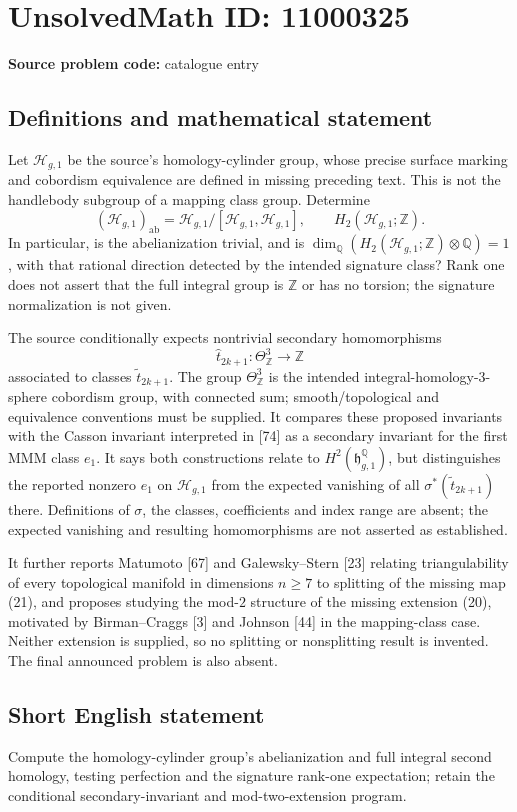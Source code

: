 \documentclass[11pt]{article}
\newcommand{\Z}{\mathbb{Z}}
\newcommand{\Q}{\mathbb{Q}}
\begin{document}
\section*{UnsolvedMath ID: 11000325}
\textbf{Source problem code:} catalogue entry
\subsection{Definitions and mathematical statement}
Let \(\mathcal H_{g,1}\) be the source's homology-cylinder group, whose precise surface marking and cobordism equivalence are defined in missing preceding text. This is not the handlebody subgroup of a mapping class group. Determine
\[
 (\mathcal H_{g,1})_{\mathrm{ab}}
   =\mathcal H_{g,1}/[\mathcal H_{g,1},\mathcal H_{g,1}],
 \qquad H_2(\mathcal H_{g,1};\Z).
\]
In particular, is the abelianization trivial, and is
\(\dim_\Q(H_2(\mathcal H_{g,1};\Z)\otimes\Q)=1\), with that rational direction detected by the intended signature class? Rank one does not assert that the full integral group is \(\Z\) or has no torsion; the signature normalization is not given.

The source conditionally expects nontrivial secondary homomorphisms
\[
 \widehat t_{2k+1}:\Theta^3_{\Z}\longrightarrow\Z
\]
associated to classes \(\widetilde t_{2k+1}\). The group \(\Theta^3_{\Z}\) is the intended integral-homology-\(3\)-sphere cobordism group, with connected sum; smooth/topological and equivalence conventions must be supplied. It compares these proposed invariants with the Casson invariant interpreted in [74] as a secondary invariant for the first MMM class \(e_1\). It says both constructions relate to \(H^2(\mathfrak h_{g,1}^{\Q})\), but distinguishes the reported nonzero \(e_1\) on \(\mathcal H_{g,1}\) from the expected vanishing of all \(\sigma^*(\widetilde t_{2k+1})\) there. Definitions of \(\sigma\), the classes, coefficients and index range are absent; the expected vanishing and resulting homomorphisms are not asserted as established.

It further reports Matumoto [67] and Galewsky--Stern [23] relating triangulability of every topological manifold in dimensions \(n\geq7\) to splitting of the missing map (21), and proposes studying the mod-\(2\) structure of the missing extension (20), motivated by Birman--Craggs [3] and Johnson [44] in the mapping-class case. Neither extension is supplied, so no splitting or nonsplitting result is invented. The final announced problem is also absent.
\subsection{Short English statement}
Compute the homology-cylinder group's abelianization and full integral second homology, testing perfection and the signature rank-one expectation; retain the conditional secondary-invariant and mod-two-extension program.
\end{document}
